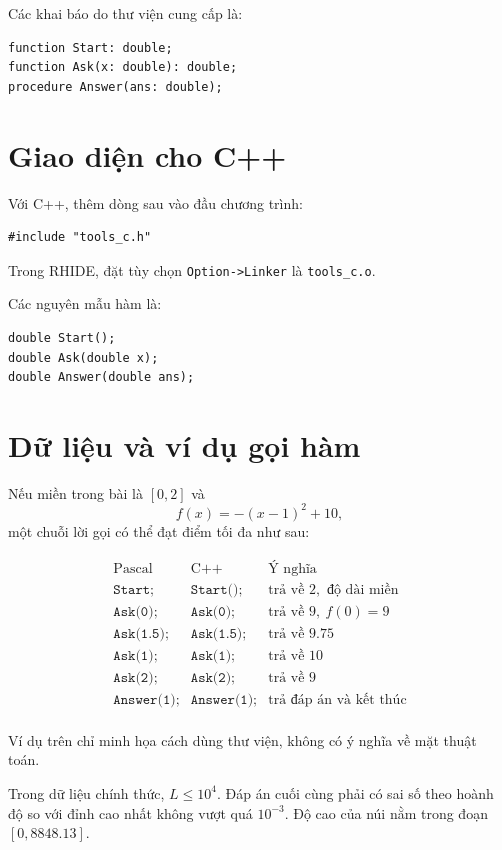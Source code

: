 \documentclass[11pt]{article}
\begin{document}
Các khai báo do thư viện cung cấp là:
\begin{verbatim}
function Start: double;
function Ask(x: double): double;
procedure Answer(ans: double);
\end{verbatim}

\section{Giao diện cho C++}

Với C++, thêm dòng sau vào đầu chương trình:
\begin{verbatim}
#include "tools_c.h"
\end{verbatim}
Trong RHIDE, đặt tùy chọn \texttt{Option->Linker} là \texttt{tools\_c.o}.

Các nguyên mẫu hàm là:
\begin{verbatim}
double Start();
double Ask(double x);
double Answer(double ans);
\end{verbatim}

\section{Dữ liệu và ví dụ gọi hàm}

Nếu miền trong bài là \([0,2]\) và
\[
  f(x)=-(x-1)^2+10,
\]
một chuỗi lời gọi có thể đạt điểm tối đa như sau:

\[
\begin{array}{c|c|c}
\text{Pascal} & \text{C++} & \text{Ý nghĩa} \\
\hline
\texttt{Start;} & \texttt{Start();} & \text{trả về }2,\text{ độ dài miền} \\
\texttt{Ask(0);} & \texttt{Ask(0);} & \text{trả về }9,\ f(0)=9 \\
\texttt{Ask(1.5);} & \texttt{Ask(1.5);} & \text{trả về }9.75 \\
\texttt{Ask(1);} & \texttt{Ask(1);} & \text{trả về }10 \\
\texttt{Ask(2);} & \texttt{Ask(2);} & \text{trả về }9 \\
\texttt{Answer(1);} & \texttt{Answer(1);} & \text{trả đáp án và kết thúc} \\
\end{array}
\]

Ví dụ trên chỉ minh họa cách dùng thư viện, không có ý nghĩa về mặt thuật
toán.

Trong dữ liệu chính thức, \(L\le 10^4\). Đáp án cuối cùng phải có sai số theo
hoành độ so với đỉnh cao nhất không vượt quá \(10^{-3}\). Độ cao của núi nằm
trong đoạn \([0,8848.13]\).
\end{document}
